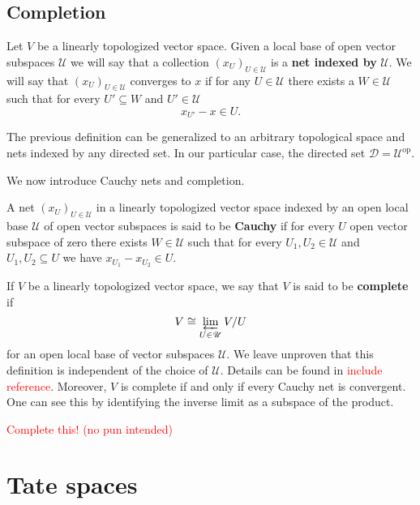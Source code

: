 \subsection*{Completion}
\begin{definition}\label{def:net-in-a-topological-vector-space}
	Let $V$ be a linearly topologized vector space. Given a local base of open vector subspaces $\mathscr{U}$ we will say that a collection $(x_{U})_{U\in \mathscr{U}}$ is a \textbf{net indexed by} $\mathscr{U}$. We will say that $(x_{U})_{U\in \mathscr{U}}$ converges to $x$ if for any $U \in \mathscr{U}$ there exists a $W\in\mathscr{U}$ such that for every $U' \subseteq W$ and $U'\in\mathscr{U}$
	\[
		x_{U'} - x \in U.
	\]
\end{definition}
\begin{remark}\label{rem:nets}
	The previous definition can be generalized to an arbitrary topological space and nets indexed by any directed set. In our particular case, the directed set $\mathcal{D} = \mathscr{U}^{\text{op}}$.
\end{remark}
We now introduce Cauchy nets and completion.
\begin{definition}\label{def:cauchy-nets}
	A net $(x_{U})_{U \in \mathscr{U}}$ in a linearly topologized vector space indexed by an open local base $\mathscr{U}$ of open vector subspaces is said to be \textbf{Cauchy} if for every $U$ open vector subspace of zero there exists $W \in \mathscr{U}$ such that for every $U_{1},U_{2} \in \mathscr{U}$ and $U_{1}, U_{2}\subseteq U$ we have $x_{U_{1}} - x_{U_{2}} \in U$. 
\end{definition}

\begin{definition}\label{def:completion}
	If $V$ be a linearly topologized vector space, we say that $V$ is said to be \textbf{complete} if 
	\[
		V \cong \varprojlim_{U \in \mathscr{U}} V/U
	\]
	for an open local base of vector subspaces $\mathscr{U}$. We leave unproven that this definition is independent of the choice of $\mathscr{U}$. Details can be found in \textcolor{red}{include reference}. Moreover, $V$ is complete if and only if every Cauchy net is convergent. One can see this by identifying the inverse limit as a subspace of the product.
\end{definition}
\textcolor{red}{Complete this! (no pun intended) }
\section{Tate spaces}
